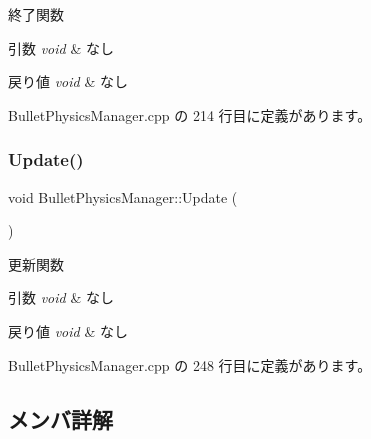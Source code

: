 終了関数 


\begin{DoxyParams}{引数}
{\em void} & なし \\
\hline
\end{DoxyParams}

\begin{DoxyRetVals}{戻り値}
{\em void} & なし \\
\hline
\end{DoxyRetVals}


 Bullet\+Physics\+Manager.\+cpp の 214 行目に定義があります。

\mbox{\label{class_bullet_physics_manager_ae3798b00a0e8b169a07d05614cb7de58}} 
\subsubsection{\texorpdfstring{Update()}{Update()}}
{\footnotesize\ttfamily void Bullet\+Physics\+Manager\+::\+Update (\begin{DoxyParamCaption}{ }\end{DoxyParamCaption})}



更新関数 


\begin{DoxyParams}{引数}
{\em void} & なし \\
\hline
\end{DoxyParams}

\begin{DoxyRetVals}{戻り値}
{\em void} & なし \\
\hline
\end{DoxyRetVals}


 Bullet\+Physics\+Manager.\+cpp の 248 行目に定義があります。



\subsection{メンバ詳解}
\mbox{\label{class_bullet_physics_manager_a991c738496cfd117c9a7f43f6bcf4003}} 
